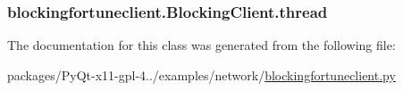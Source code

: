 \subsubsection[{thread}]{\setlength{\rightskip}{0pt plus 5cm}blockingfortuneclient.\+Blocking\+Client.\+thread}\label{classblockingfortuneclient_1_1BlockingClient_ab5fc93725cff41e3a2c1dc544c6ca2e3}


The documentation for this class was generated from the following file\+:\begin{DoxyCompactItemize}
\item 
packages/\+Py\+Qt-\/x11-\/gpl-\/4../examples/network/\hyperlink{blockingfortuneclient_8py}{blockingfortuneclient.\+py}\end{DoxyCompactItemize}
